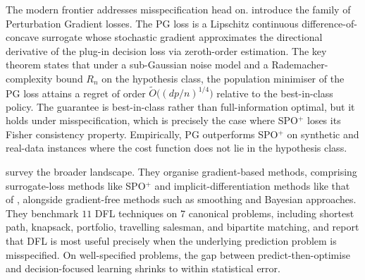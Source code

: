 The modern frontier addresses misspecification head on. \citet{HuangGupta2024}
introduce the family of Perturbation Gradient losses. The PG loss is a Lipschitz
continuous difference-of-concave surrogate whose stochastic gradient approximates
the directional derivative of the plug-in decision loss via zeroth-order
estimation. The key theorem states that under a sub-Gaussian noise model and a
Rademacher-complexity bound $R_n$ on the hypothesis class, the population
minimiser of the PG loss attains a regret of order
$\widetilde O\bigl((dp/n)^{1/4}\bigr)$ relative to the best-in-class policy. The
guarantee is best-in-class rather than full-information optimal, but it holds under
misspecification, which is precisely the case where SPO$^+$ loses its Fisher
consistency property. Empirically, PG outperforms SPO$^+$ on synthetic and
real-data instances where the cost function does not lie in the hypothesis class.

\citet{Mandi2024} survey the broader landscape. They organise gradient-based
methods, comprising surrogate-loss methods like SPO$^+$ and implicit-differentiation
methods like that of \citet{DontiAmosKolter2017}, alongside gradient-free methods such
as smoothing and Bayesian approaches. They benchmark $11$ DFL techniques on $7$
canonical problems, including shortest path, knapsack, portfolio, travelling
salesman, and bipartite matching, and report that DFL is most useful precisely when
the underlying prediction problem is misspecified. On well-specified problems,
the gap between predict-then-optimise and decision-focused learning shrinks to
within statistical error.
